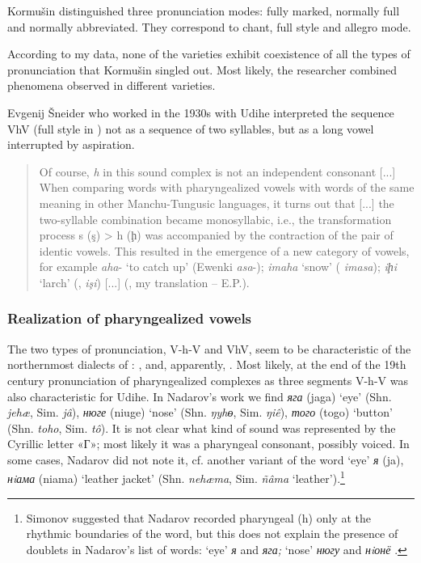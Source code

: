 \documentclass[output=paper,colorlinks,citecolor=brown]{langscibook}
\begin{document}
Kormušin distinguished three pronunciation modes: fully marked, normally full and normally abbreviated. They correspond to chant, full style and allegro mode. 

According to my data, none of the varieties exhibit coexistence of all the types of pronunciation that Kormušin singled out. Most likely, the researcher combined phenomena observed in different varieties.

Evgenij Šneider who worked in the 1930s with  Udihe interpreted the sequence VhV (full style in ) not as a sequence of two syllables, but as a long vowel interrupted by aspiration. 

\begin{quote}
Of course, \textit{h} in this sound complex is not an independent consonant [...] When comparing  words with pharyngealized vowels with words of the same meaning in other Manchu-Tungusic languages, it turns out that [...] the two-syllable combination became monosyllabic, i.e., the transformation process s (ş) > h ({ḩ}) was accompanied by the contraction of the pair of identic vowels. This resulted in the emergence of a new category of vowels, for example \textit{aha}{}- ‘to catch up’ (Ewenki \textit{asa}{}-); \textit{imaha} ‘snow’ ( \textit{imasa}); \textit{i{ḩ}i} ‘larch’ (,  \textit{işi}) [...] (\citealt[10--11]{Shneider1937}, my translation – E.P.).
\end{quote}

\subsubsection{Realization of pharyngealized vowels}


The two types of pronunciation, V-h-V and VhV, seem to be characteristic of the northernmost dialects of : , and, apparently, . Most likely, at the end of the 19th century pronunciation of pharyngealized complexes as three segments V-h-V was also characteristic for  Udihe. In Nadarov’s work we find \textit{яга} (jaga) ‘eye’ (Shn. \textit{jehæ}, Sim. \textit{jâ}), \textit{нюге} (niuge) ‘nose’ (Shn. \textit{ŋyh{ɵ}}, Sim. \textit{ŋiê}), \textit{того} (togo) ‘button’ (Shn. \textit{toho}, Sim. \textit{tô}). It is not clear what kind of sound was represented by the Cyrillic letter «Г»; most likely it was a pharyngeal consonant, possibly voiced. In some cases, Nadarov did not note it, cf. another variant of the word ‘eye’ \textit{я} (ja), \textit{нiама} (niama) ‘leather jacket’ (Shn. \textit{nehæma}, Sim. \textit{ñâma} ‘leather’).\footnote{Simonov suggested that Nadarov recorded pharyngeal (h) only at the rhythmic boundaries of the word, but this does not explain the presence of doublets in Nadarov’s list of words: ‘eye’ \textit{я} and \textit{яга;} ‘nose’ \textit{нюгу} and \textit{нiонё} \citep{Nadarov1887}.}
\end{document}
